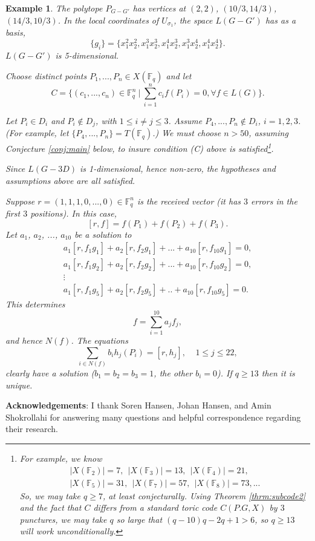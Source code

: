 \documentclass[12pt]{article}
\newtheorem{example}[theorem]{Example}
\def\fff{\mathbb{F}}
\begin{document}
\begin{example}
The polytope $P_{G-G'}$ has vertices at
$(2,2)$, $(10/3,14/3)$, $(14/3,10/3)$.
In the local coordinates of $U_{\sigma_1}$, the
space $L(G-G')$ has as a basis,
\[
\{g_i\}=
\{x_1^2 x_2^2, x_1^3 x_2^3, x_1^4 x_2^3, x_1^3 x_2^4, x_1^4 x_2^4\}.
\]
$L(G-G')$ is 5-dimensional.

Choose distinct points $P_1,...,P_n\in X(\fff_q)$ and let
\[
C=\{(c_1,...,c_n)\in \fff_q^n\ |\ \sum_{i=1}^n c_i f(P_i)=0,
\forall f\in L(G)\}.
\]

Let $P_i\in D_i$ and $P_i\notin D_j$, with
$1\leq i\not= j\leq 3$. Assume $P_4,...,P_n\notin D_i$, $i=1,2,3$.
(For example, let $\{P_4,...,P_n\}= T(\fff_q)$.)
We must choose $n>50$, assuming 
Conjecture \ref{conj:main} below, to insure condition
(C) above is satisfied\footnote{For 
example, we know
\[
\begin{array}{c}
|X(\fff_2)|=7,\ \ |X(\fff_3)|=13,\ \ |X(\fff_4)|=21,\ \\  
|X(\fff_5)|=31,\ \ |X(\fff_7)|=57,\ \  |X(\fff_8)|=73,...
\end{array}
\]
So, we may take $q\geq 7$, at least conjecturally. 
Using Theorem \ref{thrm:subcode2} and the fact that $C$ differs from a 
standard toric code $C(P.G,X)$ by $3$ punctures, we may take
$q$ so large that $(q-10)q-2q+1>6$, so $q\geq 13$ will work
unconditionally.
}.

Since $L(G-3D)$ is 1-dimensional, hence non-zero,
the hypotheses and assumptions above are all
satisfied. 

Suppose $r=(1,1,1,0,...,0)\in\fff_q^n$ is the
received vector (it has $3$ errors in the first $3$ positions).
In this case,
\[
[r,f]=f(P_1)+f(P_2)+f(P_3).
\]
Let $a_1$, $a_2$, ..., $a_{10}$ be a solution to
\[
\begin{array}{c}
a_1[r,f_1g_1]+a_2[r,f_2g_1]+...+a_{10}[r,f_{10}g_1]=0,\\
a_1[r,f_1g_2]+a_2[r,f_2g_2]+...+a_{10}[r,f_{10}g_2]=0,\\
\vdots\\
a_1[r,f_1g_{5}]+a_2[r,f_2g_{5}]+..+a_{10}[r,f_{10}g_{5}]=0.
\end{array}
\]
This determines
\[
f=\sum_{i=1}^{10} a_jf_j,
\]
and hence $N(f)$.
The equations
\[
\sum_{i\in N(f)} b_i h_j(P_i)=[r,h_j],\ \ \ \ \ 1\leq j\leq 22,
\]
clearly have a solution ($b_1=b_2=b_3=1$, the other $b_i=0$).
If $q\geq 13$ then it is unique.
\end{example}


{\bf Acknowledgements}:
I thank Soren Hansen, Johan Hansen, and Amin Shokrollahi for 
answering many questions and helpful
correspondence regarding their research.
\end{document}

